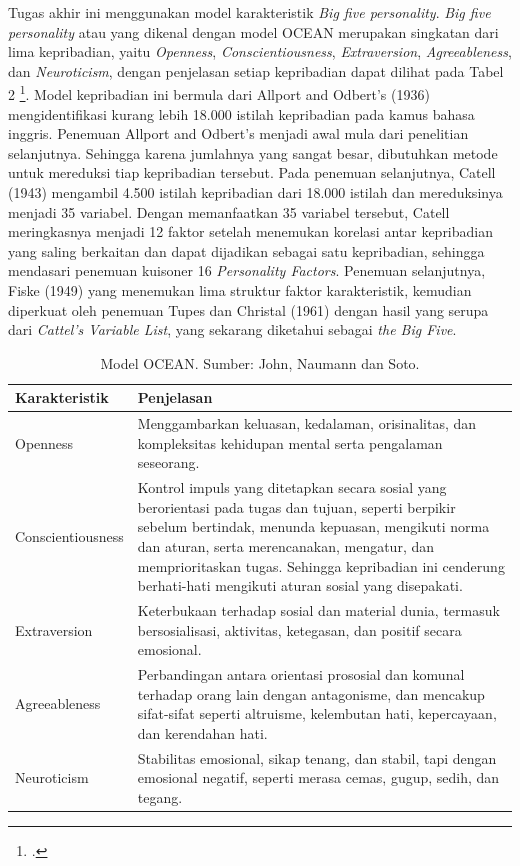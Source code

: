 \documentclass[a4paper,twoside]{article}
\begin{document}
	Tugas akhir ini menggunakan model karakteristik \textit{Big five personality}. \textit{Big five personality} atau yang dikenal dengan model OCEAN merupakan singkatan dari lima kepribadian, yaitu \textit{Openness}, \textit{Conscientiousness}, \textit{Extraversion},
	\textit{Agreeableness}, dan \textit{Neuroticism}, dengan penjelasan setiap kepribadian dapat dilihat pada Tabel 2 \footcite{JohnNaumannSoto2008BigFive}. Model kepribadian ini bermula dari Allport and Odbert's (1936) mengidentifikasi kurang lebih 18.000 istilah 
	kepribadian pada kamus bahasa inggris. Penemuan Allport and Odbert's menjadi awal mula dari penelitian selanjutnya. Sehingga karena jumlahnya yang sangat besar, dibutuhkan metode untuk mereduksi tiap kepribadian tersebut. Pada penemuan selanjutnya, Catell (1943) 
	mengambil 4.500 istilah kepribadian dari 18.000 istilah dan mereduksinya menjadi 35 variabel. Dengan memanfaatkan 35 variabel tersebut, Catell meringkasnya menjadi 12 faktor setelah menemukan korelasi antar kepribadian yang saling berkaitan dan dapat dijadikan 
	sebagai satu kepribadian, sehingga mendasari penemuan kuisoner 16 \textit{Personality Factors}. Penemuan selanjutnya, Fiske (1949) yang menemukan lima struktur faktor karakteristik, kemudian diperkuat oleh penemuan Tupes dan Christal (1961) dengan hasil yang serupa 
	dari \textit{Cattel's Variable List}, yang sekarang diketahui sebagai \textit{the Big Five}.
	\begin{table}[H]
		\caption{Model OCEAN. Sumber: John, Naumann dan Soto.}
		\label{tab:tabel_ocean}
		\begin{tabularx}{\textwidth}{|l|X|}
			\hline
			\textbf{Karakteristik} & \textbf{Penjelasan} \\
			\hline
			Openness & Menggambarkan keluasan, kedalaman, orisinalitas, dan kompleksitas kehidupan mental serta pengalaman seseorang. \\
			\hline
			Conscientiousness & Kontrol impuls yang ditetapkan secara sosial yang berorientasi pada tugas dan tujuan, seperti berpikir sebelum bertindak, menunda kepuasan, mengikuti norma dan aturan, serta merencanakan, mengatur, 
			dan memprioritaskan tugas. Sehingga kepribadian ini cenderung berhati-hati mengikuti aturan sosial yang disepakati. \\
			\hline
			Extraversion & Keterbukaan terhadap sosial dan material dunia, termasuk bersosialisasi, aktivitas, ketegasan, dan positif secara emosional. \\
			\hline
			Agreeableness & Perbandingan antara orientasi prososial dan komunal terhadap orang lain dengan antagonisme, dan mencakup sifat-sifat seperti altruisme, kelembutan hati, kepercayaan, dan kerendahan hati. \\
			\hline
			Neuroticism & Stabilitas emosional, sikap tenang, dan stabil, tapi dengan emosional negatif, seperti merasa cemas, gugup, sedih, dan tegang. \\
			\hline
		\end{tabularx}
	\end{table}
\end{document}
